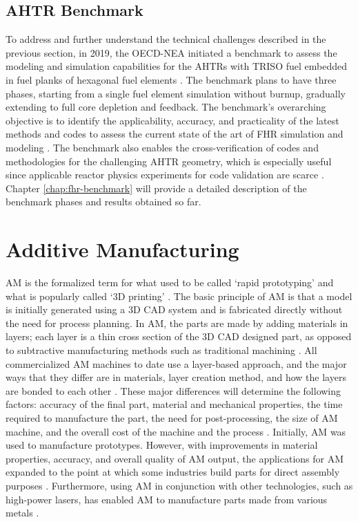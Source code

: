 \subsection{AHTR Benchmark}
To address and further understand the technical challenges described 
in the previous section, in 2019, the OECD-NEA initiated a benchmark to assess the 
modeling and simulation capabilities for the \glspl{AHTR} with 
\gls{TRISO} fuel embedded in fuel planks of hexagonal fuel elements
\cite{noauthor_fluoride_nodate}. 
The benchmark plans to have three phases, starting from a single fuel element 
simulation without burnup, gradually extending to full core depletion and feedback. 
The benchmark's overarching objective is to identify the applicability, accuracy, 
and practicality of the latest methods and codes to assess the current state 
of the art of FHR simulation and modeling \cite{petrovic_preliminary_2021}. 
The benchmark also enables the cross-verification of codes and methodologies 
for the challenging \gls{AHTR} geometry, which is especially useful since 
applicable reactor physics experiments for code validation are scarce 
\cite{petrovic_fhrahtr_2019,petrovic_preliminary_2021}. 
Chapter \ref{chap:fhr-benchmark} will provide a detailed description of the 
benchmark phases and results obtained so far.

\section{Additive Manufacturing}
\gls{AM} is the formalized term for what used to be called `rapid prototyping' 
and what is popularly called `3D printing' \cite{gibson_additive_2014}. 
The basic principle of \gls{AM} is that a model is initially generated using a
\gls{3D CAD} system and is fabricated directly without the need for process 
planning. 
In \gls{AM}, the parts are made by adding materials in layers; each layer is a 
thin cross section of the \gls{3D CAD} designed part, as opposed 
to subtractive manufacturing methods such as traditional machining
\cite{standard_standard_2012}. 
All commercialized \gls{AM} machines to date use a layer-based approach, and 
the major ways that they differ are in materials, layer creation method, and 
how the layers are bonded to each other \cite{gibson_additive_2014}.
These major differences will determine the following factors: accuracy of the 
final part, material and mechanical properties, the time required to manufacture 
the part, the need for post-processing, the size of \gls{AM} machine, and the overall 
cost of the machine and the process \cite{gibson_additive_2014}. 
Initially, \gls{AM} was used to manufacture prototypes. 
However, with improvements in material properties, accuracy, and overall quality 
of \gls{AM} output, the applications for \gls{AM} expanded to the 
point at which some industries build parts for direct assembly purposes
\cite{uriondo_present_2015}.  
Furthermore, using \gls{AM} in conjunction with other technologies, such as 
high-power lasers, has enabled \gls{AM} to manufacture parts made from various 
metals \cite{gibson_additive_2014}. 

